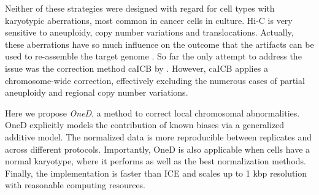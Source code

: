 \documentclass{bioinfo}
\begin{document}
Neither of these strategies were designed with regard for cell types with
karyotypic aberrations, most common in cancer cells in culture.  Hi-C is
very sensitive to aneuploidy, copy number variations and translocations.
Actually, these aberrations have so much influence on the outcome that the
artifacts can be used to re-assemble the target genome
\citep{korbel2013genome}.  So far the only attempt to address the issue
was the correction method caICB by \cite{wu2016computational}. However,
caICB applies a chromosome-wide correction, effectively excluding the
numerous cases of partial aneuploidy and regional copy number variations.

Here we propose \textit{OneD}, a method to correct local chromosomal
abnormalities. OneD explicitly models the contribution of known biases via
a generalized additive model. The normalized data is more reproducible
between replicates and across different protocols. Importantly, OneD is
also applicable when cells have a normal karyotype, where it performs as
well as the best normalization methods. Finally, the implementation is
faster than ICE and scales up to 1 kbp resolution with reasonable
computing resources.

\end{document}
